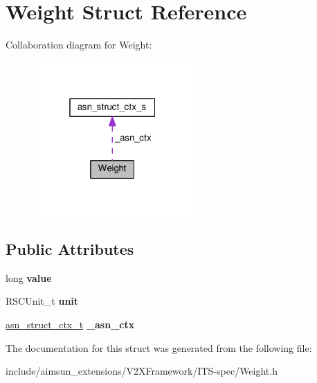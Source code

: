 \hypertarget{structWeight}{}\section{Weight Struct Reference}
\label{structWeight}


Collaboration diagram for Weight\+:\nopagebreak
\begin{figure}[H]
\begin{center}
\leavevmode
\includegraphics[width=172pt]{structWeight__coll__graph}
\end{center}
\end{figure}
\subsection*{Public Attributes}
\begin{DoxyCompactItemize}
\item 
long {\bfseries value}\hypertarget{structWeight_a6a4f035138816b685b514795f995dcdb}{}\label{structWeight_a6a4f035138816b685b514795f995dcdb}

\item 
R\+S\+C\+Unit\+\_\+t {\bfseries unit}\hypertarget{structWeight_ab04592ab5ac2147c7396065026867e70}{}\label{structWeight_ab04592ab5ac2147c7396065026867e70}

\item 
\hyperlink{structasn__struct__ctx__s}{asn\+\_\+struct\+\_\+ctx\+\_\+t} {\bfseries \+\_\+asn\+\_\+ctx}\hypertarget{structWeight_a1103fca9d9ba9a297c6ccac250ac2fce}{}\label{structWeight_a1103fca9d9ba9a297c6ccac250ac2fce}

\end{DoxyCompactItemize}


The documentation for this struct was generated from the following file\+:\begin{DoxyCompactItemize}
\item 
include/aimsun\+\_\+extensions/\+V2\+X\+Framework/\+I\+T\+S-\/spec/Weight.\+h\end{DoxyCompactItemize}
